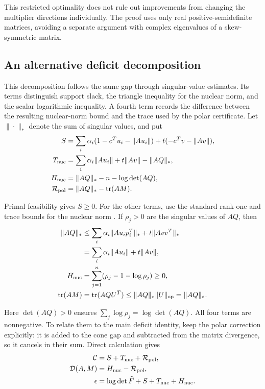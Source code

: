 This restricted optimality does not rule out improvements from changing the multiplier directions individually. The proof uses only real positive-semidefinite matrices, avoiding a separate argument with complex eigenvalues of a skew-symmetric matrix.

\subsection{An alternative deficit decomposition}\label{sec:10.3}

This decomposition follows the same gap through singular-value estimates.
Its terms distinguish support slack, the triangle inequality for the nuclear
norm, and the scalar logarithmic inequality. A fourth term records the
difference between the resulting nuclear-norm bound and the trace used by
the polar certificate.
Let $\|\cdot\|_*$ denote the sum of singular values, and put
\begin{equation}\label{eq:10.6}
\begin{aligned}
S&=\sum_i\alpha_i(1-c^Tu_i-\|Au_i\|)+t(-c^Tv-\|Av\|),\\
T_{\rm nuc}&=\sum_i\alpha_i\|Au_i\|+t\|Av\|-\|AQ\|_*,\\
H_{\rm nuc}&=\|AQ\|_*-n-\log\det(AQ),\\
\mathcal R_{\rm pol}&=\|AQ\|_*-\operatorname{tr}(AM).
\end{aligned}
\end{equation}

Primal feasibility gives $S\ge0$. For the other terms, use the standard rank-one and trace bounds for the nuclear norm \cite{HJ1985}. If $\rho_j>0$ are the singular values of $AQ$, then
\begin{equation}\label{eq:10.7}
\begin{aligned}
\|AQ\|_*
&\le\sum_i\alpha_i\|Au_i p_i^T\|_*+t\|Avv^T\|_*\\
&=\sum_i\alpha_i\|Au_i\|+t\|Av\|,\\
H_{\rm nuc}&=\sum_{j=1}^n(\rho_j-1-\log\rho_j)\ge0,\\
\operatorname{tr}(AM)&=\operatorname{tr}(AQU^T)
\le\|AQ\|_*\|U\|_{\rm op}=\|AQ\|_*.
\end{aligned}
\end{equation}

Here $\det(AQ)>0$ ensures $\sum_j\log\rho_j=\log\det(AQ)$.
All four terms are nonnegative. To relate them to the main deficit identity,
keep the polar correction explicitly: it is added to the cone gap and
subtracted from the matrix divergence, so it cancels in their sum.
Direct calculation gives
\begin{equation}\label{eq:10.8}
\begin{aligned}
\mathcal C&=S+T_{\rm nuc}+\mathcal R_{\rm pol},\\
\mathcal D(A,M)&=H_{\rm nuc}-\mathcal R_{\rm pol},\\
\epsilon&=\log\det\widehat F+S+T_{\rm nuc}+H_{\rm nuc}.
\end{aligned}
\end{equation}

